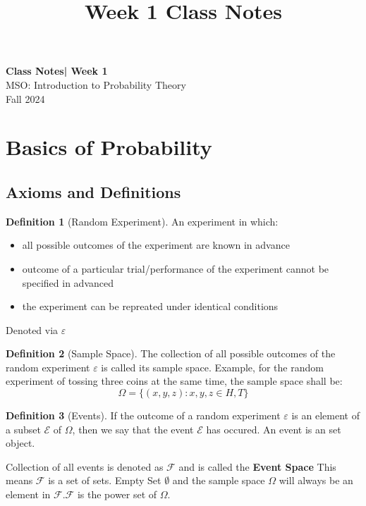 \documentclass[11pt]{article}
\theoremstyle{definition}
\newtheorem{defn}{Definition}
\begin{document}
\setcounter{section}{0}
\title{Week 1 Class Notes}

\thispagestyle{empty}

\begin{center}
{\LARGE \bf Class Notes| Week 1}\\
{\large MSO: Introduction to Probability Theory}\\
Fall 2024
\end{center}


\tableofcontents


\section{Basics of Probability}
\subsection{Axioms and Definitions}

\begin{defn}[Random Experiment] An experiment in which:
\begin{itemize}
\item all possible outcomes of the experiment are known in advance
\item outcome of a particular trial/performance of the experiment cannot be specified in advanced
\item the experiment can be repreated under identical conditions
\end{itemize}
Denoted via $\varepsilon$
\end{defn}

\begin{defn}
[Sample Space] The collection of all possible outcomes of the random experiment $\varepsilon$ is called its sample space. Example, for the random experiment of tossing three coins at the same time, the sample space shall be:
$$
\Omega = \{(x,y,z): x,y,z \in {H, T}\}
$$
\end{defn}

\begin{defn}
[Events] If the outcome of a random experiment $\varepsilon$ is an element of a subset $\mathcal{E}$ of $\Omega$, then we say that the event $\mathcal{E}$ has occured. An event is an set object.

Collection of all events is denoted as $\mathcal{F}$ and is called the \textbf{Event Space}  This means $\mathcal{F}$ is a set of sets. Empty Set $\emptyset$ and the sample space $\Omega$ will always be an element in $\mathcal{F}$.$\mathcal{F}$ is the power set of $\Omega$.
\end{defn}
\end{document}
